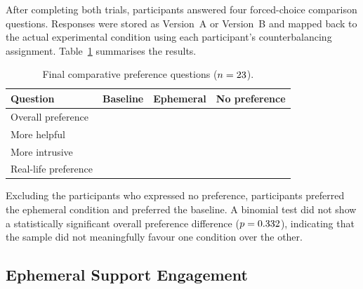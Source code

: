 After completing both trials, participants answered four forced-choice comparison questions. Responses were stored as Version~A or Version~B and mapped back to the actual experimental condition using each participant's counterbalancing assignment. Table~\ref{tab:preference} summarises the results.

\begin{table}[htbp]
    \centering
    \caption{Final comparative preference questions ($n = 23$).}
    \label{tab:preference}
    \begin{tabular}{@{}lccc@{}}
        \toprule
        Question & Baseline & Ephemeral & No preference \\
        \midrule
        Overall preference & \GenPrefOverallB{} & \GenPrefOverallE{} & \GenPrefOverallN{} \\
        More helpful & \GenPrefHelpB{} & \GenPrefHelpE{} & \GenPrefHelpN{} \\
        More intrusive & \GenPrefIntrB{} & \GenPrefIntrE{} & \GenPrefIntrN{} \\
        Real-life preference & \GenPrefLifeB{} & \GenPrefLifeE{} & \GenPrefLifeN{} \\
        \bottomrule
    \end{tabular}
\end{table}

Excluding the \GenPrefOverallN{} participants who expressed no preference, \GenPrefOverallE{} participants preferred the ephemeral condition and \GenPrefOverallB{} preferred the baseline. A binomial test did not show a statistically significant overall preference difference ($p = 0.332{}$), indicating that the sample did not meaningfully favour one condition over the other.

\subsection{Ephemeral Support Engagement}

